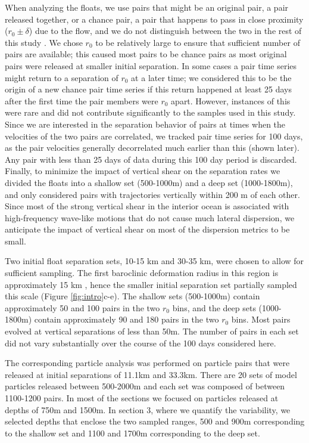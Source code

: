\documentclass[]{ametsoc}
\begin{document}
When analyzing the floats, we use pairs that might be an original pair, a pair released together, or a chance pair, a pair that happens to pass in close proximity ($r_0 \pm \delta$) due to the flow, and we do not distinguish between the two in the rest of this study \citep{morel1974relative, lacasce2000relative}. We chose $r_0$ to be relatively large to ensure that sufficient number of pairs are available; this caused most pairs to be chance pairs as most original pairs were released at smaller initial separation. In some cases a pair time series might return to a separation of $r_0$ at a later time; we considered this to be the origin of a new chance pair time series if this return happened at least 25 days after the first time the pair members were $r_0$ apart. However, instances of this were rare and did not contribute significantly to the samples used in this study. Since we are interested in the separation behavior of pairs at times when the velocities of the two pairs are correlated, we tracked pair time series for 100 days, as the pair velocities generally decorrelated much earlier than this (shown later). Any pair with less than 25 days of data during this 100 day period is discarded. Finally, to minimize the impact of vertical shear on the separation rates we divided the floats into a shallow set (500-1000m) and a deep set (1000-1800m), and only considered pairs with trajectories vertically within 200 m of each other. Since most of the strong vertical shear in the interior ocean is associated with high-frequency wave-like motions that do not cause much lateral dispersion, we anticipate the impact of vertical shear on most of the dispersion metrics to be small.

Two initial float separation sets, 10-15 km and 30-35 km, were chosen to allow for sufficient sampling. The first baroclinic deformation radius in this region is approximately 15 km \citep{chelton1998geographical}, hence the smaller initial separation set partially sampled this scale (Figure \ref{fig:intro}c-e). The shallow sets (500-1000m) contain approximately 50 and 100 pairs in the two $r_0$ bins, and the deep sets (1000-1800m) contain approximately 90 and 180 pairs in the two $r_0$ bins. Most pairs evolved at vertical separations of less than 50m. The number of pairs in each set did not vary substantially over the course of the 100 days considered here. 

The corresponding particle analysis was performed on particle pairs that were released at initial separations of 11.1km and 33.3km. There are 20 sets of model particles released between 500-2000m and each set was composed of between 1100-1200 pairs. In most of the sections we focused on particles released at depths of 750m and 1500m. In section 3, where we quantify the variability, we selected depths that enclose the two sampled ranges, 500 and 900m corresponding to the shallow set and 1100 and 1700m corresponding to the deep set.
\end{document}
